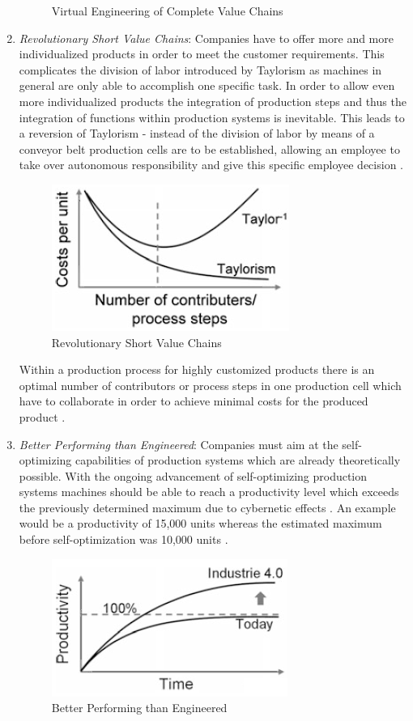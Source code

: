 \begin{enumerate}
\begin{figure}[h!]
		\centering
		\caption{Virtual Engineering of Complete Value Chains \cite{IN4HYPO}}
		\label{fig:2.3}
	\end{figure}
	\item \textit{Revolutionary Short Value Chains}: Companies have to offer more and more individualized products in order to meet the customer requirements. This complicates the division of labor introduced by Taylorism as machines in general are only able to accomplish one specific task. In order to allow even more individualized products the integration of production steps and thus the integration of functions within production systems is inevitable. This leads to a reversion of Taylorism - instead of the division of labor by means	of a conveyor belt production cells are to be established, allowing an employee to take over autonomous responsibility and give this specific employee decision \cite{IN4HYPO}. 
	\begin{figure}[h!]
		\includegraphics[scale=0.5]{./gfx/revvalchain}
		\centering
		\caption{Revolutionary Short Value Chains \cite{IN4HYPO}}
		\label{fig:2.4}
	\end{figure}
	
	Within a production process for highly customized products there is an optimal number of contributors or process steps in one production cell which have to collaborate in order to achieve minimal costs for the produced product  \cite{IN4HYPO}.
	\item \textit{Better Performing than Engineered}: Companies must aim at the self-optimizing	capabilities of production systems which are already theoretically possible. With the ongoing advancement of self-optimizing production systems machines should be able to reach a productivity level which exceeds the previously determined maximum due to cybernetic effects . An example would be a productivity of 15,000 units whereas the estimated maximum before self-optimization was 10,000 units \cite{IN4HYPO}.
	\begin{figure}[h!]
		\includegraphics[scale=0.5]{./gfx/revengg}
		\centering
		\caption{Better Performing than Engineered \cite{IN4HYPO}}
		\label{fig:2.5}
	\end{figure}
\end{enumerate}
